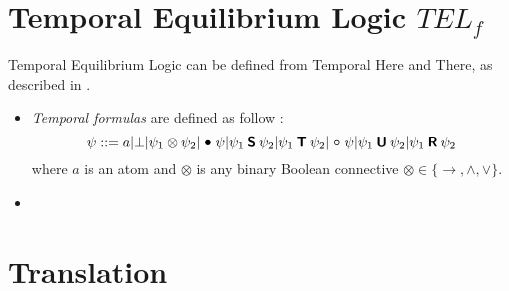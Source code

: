 \section{Temporal Equilibrium Logic $TEL_f$}\label{sec:telf}

Temporal Equilibrium Logic can be defined from Temporal Here and There, as described in \cite{cakascsc18a}.

\begin{itemize}
  \item \emph{Temporal formulas} are defined as follow :
  $$\psi ::= a | \bot | \psi_1\otimes\psi_2 | \previous\psi | \psi_1\since\psi_2 | \psi_1\trigger\psi_2 | \next\psi | \psi_1\until\psi_2 | \psi_1\release\psi_2 $$
  where $a$ is an atom and $\otimes$ is any binary Boolean connective $\otimes \in \{\rightarrow, \wedge, \vee\}$.
  \item
\end{itemize}

\section{Translation}\label{sec:trans}

